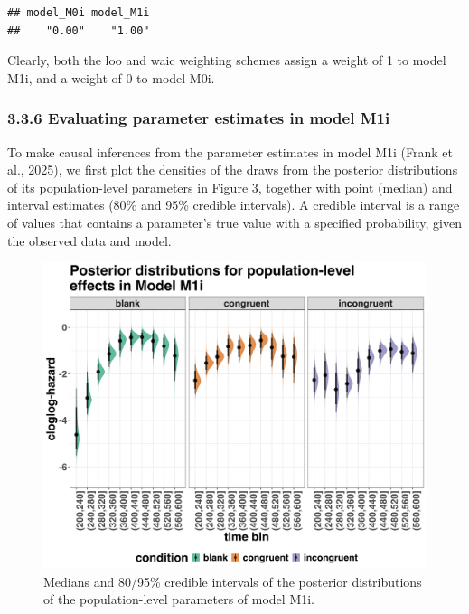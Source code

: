\documentclass[
  man, donotrepeattitle,floatsintext]{apa6}
\begin{document}
\begin{verbatim}
## model_M0i model_M1i 
##    "0.00"    "1.00"
\end{verbatim}

\normalsize

Clearly, both the loo and waic weighting schemes assign a weight of 1 to model M1i, and a weight of 0 to model M0i.

\subsubsection{3.3.6 Evaluating parameter estimates in model M1i}\label{evaluating-parameter-estimates-in-model-m1i}

To make causal inferences from the parameter estimates in model M1i (Frank et al., 2025), we first plot the densities of the draws from the posterior distributions of its population-level parameters in Figure 3, together with point (median) and interval estimates (80\% and 95\% credible intervals). A credible interval is a range of values that contains a parameter's true value with a specified probability, given the observed data and model.



\begin{figure}[H]

{\centering \includegraphics[width=0.8\linewidth,height=0.67\textheight,]{../Tutorial_2_Bayesian/figures/M1i_postdistr} 

}

\caption{Medians and 80/95\% credible intervals of the posterior distributions of the population-level parameters of model M1i.}\label{fig:plot-fixed-effects}
\end{figure}
\end{document}

